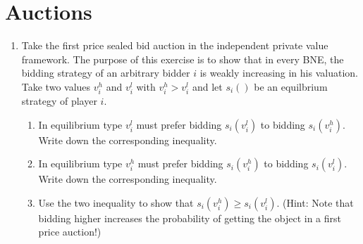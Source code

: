 \documentclass[a4paper,12pt]{article}
\begin{document}
\section{Auctions}
\label{sec:auctions}

\begin{enumerate}

\item Take the first price sealed bid auction in the independent private value framework. The purpose of this exercise is to show that in every BNE, the bidding strategy of an arbitrary bidder $i$ is weakly increasing in his valuation. Take two values $v_i^h$ and $v_i^l$ with $v_i^h>v_i^l$ and let $s_i()$ be an equilbrium strategy of player $i$.
  \begin{enumerate}
  \item In equilibrium type $v_i^l$ must prefer bidding $s_i(v_i^l)$ to bidding $s_i(v_i^h)$. Write down the corresponding inequality.
  \item In equilibrium type $v_i^h$ must prefer bidding $s_i(v_i^h)$ to bidding $s_i(v_i^l)$. Write down the corresponding inequality.
  \item Use the two inequality to show that $s_i(v_i^h)\geq s_i(v_i^l)$. (Hint: Note that bidding higher increases the probability of getting the object in a first price auction!)
  \end{enumerate}
  

\end{enumerate}
\end{document}
